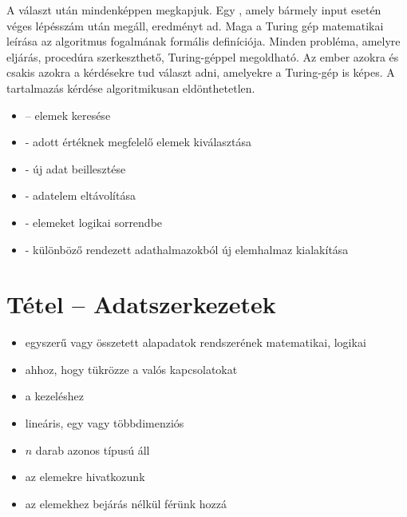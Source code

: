 \documentclass[main.tex]{subfiles}
\begin{document}
  A választ  után mindenképpen megkapjuk.
  Egy , amely bármely input esetén
  véges lépésszám után megáll, eredményt ad.
  Maga a Turing gép matematikai leírása az algoritmus
  fogalmának formális definíciója.
  Minden probléma, amelyre eljárás,
  procedúra szerkeszthető, Turing-géppel megoldható.
  Az ember azokra és csakis azokra a kérdésekre tud választ adni,
  amelyekre a Turing-gép is képes.
  A tartalmazás kérdése algoritmikusan eldönthetetlen.
  \begin{itemize}
    \item {} – elemek keresése
    
    \item {} - adott értéknek megfelelő elemek kiválasztása
    
    \item {} - új adat beillesztése
    
    \item {} - adatelem eltávolítása
    
    \item {} - elemeket logikai sorrendbe
    
    \item {} - különböző rendezett
    adathalmazokból új elemhalmaz kialakítása


  \end{itemize}



  \section{Tétel – Adatszerkezetek} %
  \begin{itemize}
    \item egyszerű vagy összetett alapadatok
    rendszerének matematikai, logikai 

    \item {} ahhoz, hogy tükrözze a valós kapcsolatokat
    
    \item {} a kezeléshez
  \end{itemize}

  \begin{itemize}
    \item lineáris, egy vagy többdimenziós
    
    \item $n$ darab azonos típusú  áll
    
    \item az elemekre  hivatkozunk
    
    \item az elemekhez bejárás nélkül férünk hozzá
  \end{itemize}
\end{document}
